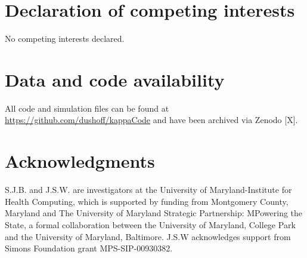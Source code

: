\documentclass{article}[12pt]
\begin{document}




\section*{Declaration of competing interests}
No competing interests declared.

\section*{Data and code availability}
All code and simulation files can be found at \url{https://github.com/dushoff/kappaCode} and have been archived via Zenodo [X].


\section*{Acknowledgments}
S.J.B. and J.S.W. are investigators at the University of Maryland-Institute for Health Computing, which is supported by funding from Montgomery County, Maryland and The University of Maryland Strategic Partnership: MPowering the State, a formal collaboration between the University of Maryland, College Park and the University of Maryland, Baltimore. J.S.W acknowledges support from Simons Foundation grant MPS-SIP-00930382.

\newpage

\newpage


\end{document}
